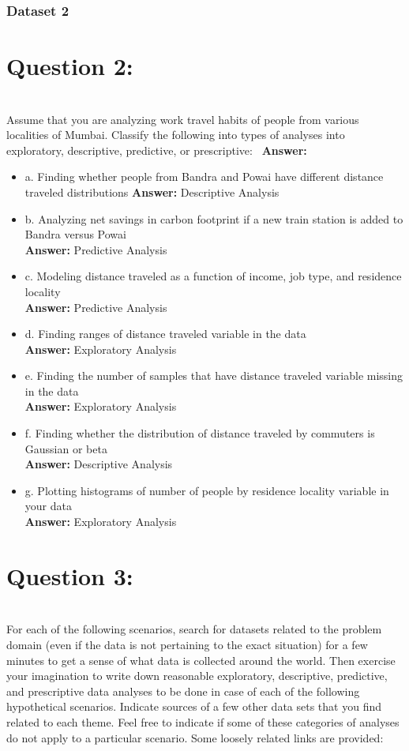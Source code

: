 \documentclass[12pt]{article}
\begin{document}
\subsubsection*{Dataset 2}





\section*{Question 2:}\\
Assume that you are analyzing work travel habits of people from various localities of Mumbai. Classify the
following into types of analyses into exploratory, descriptive, predictive, or prescriptive: 
\vspace*{0.5cm}\
\textbf{Answer:} 
\begin{itemize}
    \item a. Finding whether people from Bandra and Powai have different distance traveled distributions
    \textbf{Answer:} Descriptive Analysis
    \item b. Analyzing net savings in carbon footprint if a new train station is added to Bandra versus Powai\\
    \textbf{Answer:} Predictive Analysis
    \item c. Modeling distance traveled as a function of income, job type, and residence locality\\
    \textbf{Answer:} Predictive Analysis
    \item d. Finding ranges of distance traveled variable in the data\\ 
    \textbf{Answer:} Exploratory Analysis
    \item e. Finding the number of samples that have distance traveled variable missing in the data \\
    \textbf{Answer:} Exploratory Analysis
    \item f. Finding whether the distribution of distance traveled by commuters is Gaussian or beta \\
    \textbf{Answer:} Descriptive Analysis
    \item g. Plotting histograms of number of people by residence locality variable in your data \\
    \textbf{Answer:} Exploratory Analysis
\end{itemize}

\section*{Question 3:}\\
For each of the following scenarios, search for datasets related to the problem domain (even if the data is not pertaining to the exact situation) for a few minutes to get a sense of what data is collected around the world. Then exercise your imagination to write down reasonable exploratory, descriptive, predictive, and prescriptive data analyses to be done in case of each of the following hypothetical scenarios. Indicate sources of a few other data sets that you find related to each theme. Feel free to indicate if some of these categories of analyses do not apply to a particular scenario. Some loosely related links are provided: 
\end{document}
